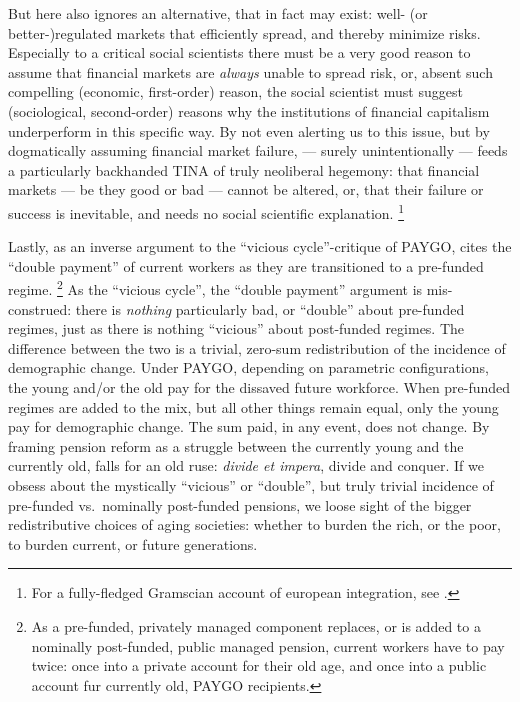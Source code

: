 \begin{enumerate}
	But \citeauthor{Cerami2009a} here also ignores an alternative, that in fact may exist:
	well- (or better-)regulated markets that efficiently spread, and thereby minimize risks.
Especially to a critical social scientists there must be a very good reason to assume that financial markets are \emph{always} unable to spread risk, or, absent such compelling (economic, first-order) reason, the social scientist must suggest (sociological, second-order) reasons why the institutions of financial capitalism underperform in this specific way.
By not even alerting us to this issue, but by dogmatically assuming financial market failure, \citeauthor{Cerami2009a} --- surely unintentionally --- feeds a particularly backhanded TINA of truly neoliberal hegemony:
that financial markets --- be they good or bad --- cannot be altered, or, that their failure or success is inevitable, and needs no social scientific explanation.
\footnote{
	For a fully-fledged Gramscian account of european integration, see \cite{Bieler2002,Bieler2003,Bieler2005}.
}

	Lastly, as an inverse argument to the ``vicious cycle''-critique of PAYGO, \citeauthor{Cerami2009a} cites the ``double payment'' of current workers as they are transitioned to a pre-funded regime.
	\footnote{
		As a pre-funded, privately managed component replaces, or is added to a nominally post-funded, public managed pension, current workers have to pay twice:
		once into a private account for their old age, and once into a public account fur currently old, PAYGO recipients.
	}
	As the ``vicious cycle'', the ``double payment'' argument is mis-construed:
	there is \emph{nothing} particularly bad, or ``double'' about pre-funded regimes, just as there is nothing ``vicious'' about post-funded regimes.
The difference between the two is a trivial, zero-sum redistribution of the incidence of demographic change.
Under PAYGO, depending on parametric configurations, the young and/or the old pay for the dissaved future workforce.
When pre-funded regimes are added to the mix, but all other things remain equal, only the young pay for demographic change.
The sum paid, in any event, does not change.
By framing pension reform as a struggle between the currently young and the currently old, \citeauthor{Cerami2009a} falls for an old ruse:
\emph{divide et impera}, divide and conquer.
If we obsess about the mystically ``vicious'' or ``double'', but truly trivial incidence of pre-funded vs.\ nominally post-funded pensions, we loose sight of the bigger redistributive choices of aging societies:
whether to burden the rich, or the poor, to burden current, or future generations.
\end{enumerate}

